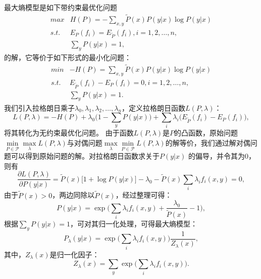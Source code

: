 \noindent 最大熵模型是如下带约束最优化问题
\begin{equation}\label{eq:maxent}
  \begin{array}{ll}
    \textit{max} & H(P) = -\sum\limits_{x,y} \tilde{P}(x)P(y|x) \log P(y|x)\\
    \textit{s.t.}& E_P(f_i) = E_{\tilde{P}}(f_i), i = 1,2,\ldots,n, \\
    & \sum\limits_y P(y|x) = 1,
  \end{array}
\end{equation}
的解，它等价于如下形式的最小化问题：
\begin{equation}
  \begin{array}{ll}
    \textit{min} & -H(P) = \sum\limits_{x,y} \tilde{P}(x)P(y|x) \log P(y|x)\\
    \textit{s.t.}&  E_{\tilde{P}}(f_i) - E_P(f_i)= 0, i = 1,2,\ldots,n, \\
    & \sum\limits_y P(y|x) = 1.
  \end{array}
\end{equation}
我们引入拉格朗日乘子$\lambda_0,\lambda_1,\lambda_2,\ldots, \lambda_n$，定义拉格朗日函数$L(P,\lambda)$：
\begin{equation}
    L(P,\lambda) = -H(P) + \lambda_0 \big(1-\sum\limits_{y} P(y|x)\big) + \sum\limits_i \lambda_i\big(E_{\tilde{P}}(f_i) - E_P(f_i)\big),
\end{equation}
将其转化为无约束最优化问题。
由于函数$L(P,\lambda)$是$P$的凸函数，原始问题$\min\limits_{P\in \mathcal P} \max\limits_{\lambda} L(P,\lambda)$与对偶问题$\max\limits_{\lambda} \min\limits_{P\in \mathcal P} L(P,\lambda)$的解等价，我们通过解对偶问题可以得到原始问题的解。对拉格朗日函数求关于$P(y|x)$ 的偏导，并令其为0，则有
\begin{equation}
    \frac{\partial L(P,\lambda)}{\partial P(y|x)} = \tilde{P}(x)\big[1 + \log P(y|x)\big] - \lambda_0 - \tilde{P}(x) \sum\limits_i \lambda_i f_i(x,y) = 0,
\end{equation}
由于$\tilde{P}(x)>0$，两边同除以$\tilde{P}(x)$，经过整理可得：
\begin{equation}
    P(y|x) = \exp\Big(\sum\limits_i \lambda_i f_i(x,y) + \frac{\lambda_0}{\tilde{P}(x)} - 1\Big),
\end{equation}
根据$\sum\limits_y P(y|x)=1$，可对其归一化处理，可得最大熵模型：
\begin{equation}
    P_\lambda(y|x) = \exp\Big(\sum\limits_i \lambda_i f_i(x,y)\Big)\frac{1}{Z_\lambda(x)},
\end{equation}
其中，$Z_\lambda(x)$是归一化因子：
\begin{equation}
    Z_\lambda(x) = \sum\limits_y \exp\Big(\sum\limits_i \lambda_i f_i(x,y)\Big).
\end{equation}
